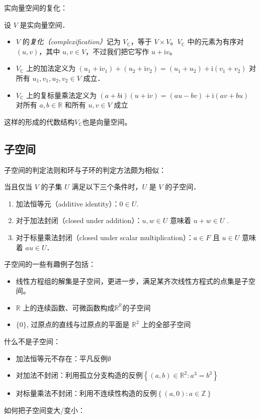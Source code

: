 实向量空间的复化：
\begin{definition}
    设 \(V\) 是实向量空间．
    \begin{itemize}
        \item \(V\) 的\emph{复化（complexification）}记为
            \(V_{\mathbb{C}}\)，等于 \(V \times
            V\)。\(V_{\mathbb{C}}\)
            中的元素为有序对 \((u, v)\)，其中
            \(u, v \in V\)，不过我们把它写作 \(u + \mathrm{i}v\)。
        \item \(V_{\mathbb{C}}\) 上的加法定义为
            \((u_1 + \mathrm{i}v_1) + (u_2 +
                \mathrm{i}v_2) = (u_1 +
            u_2) + \mathrm{i} (v_1 + v_2)\)
            对所有 \(u_1, v_1, u_2, v_2 \in V\) 成立．
        \item \(V_{\mathbb{C}}\) 上的复标量乘法定义为
            \((a + b\mathrm{i}) (u + \mathrm{i}v) =
                (au - bv) +
            \mathrm{i} (av + bu)\)
            对所有 \(a, b \in \mathbb{R}\) 和所有 \(u, v \in V\) 成立
    \end{itemize}
\end{definition}
这样的形成的代数结构\(V_{\mathbb{C}}\)也是向量空间。

\subsection{子空间}
子空间的判定法则和环与子环的判定方法颇为相似：
\begin{theorem}[子空间的条件]
    当且仅当 \(V\) 的子集 \(U\) 满足以下三个条件时，\(U\) 是 \(V\) 的子空间．
    \begin{enumerate}
        \item 加法恒等元（additive identity）：\(0 \in U\).
        \item 对于加法封闭（closed under addition）：\(u, w \in U\)
            意味着 \(u + w \in U\) .
        \item 对于标量乘法封闭（closed under scalar
            multiplication）：\(a \in F\)  且 \(u \in U\) 意味着
            \(au \in U\)．
    \end{enumerate}
\end{theorem}
子空间的一些有趣例子包括：
\begin{itemize}
    \item 线性方程组的解集是子空间，更进一步，满足某齐次线性方程式的点集是子空间。
    \item \(\mathbb{R}\) 上的连续函数、可微函数构成\(\mathbb{R}^{\mathbb{R}}\)的子空间
    \item \(\{0\}\), 过原点的直线与过原点的平面是 \(\mathbb{R}^{2}\) 上的全部子空间
\end{itemize}
什么不是子空间：
\begin{itemize}
    \item 加法恒等元不存在：平凡反例\(\emptyset\)
    \item 对加法不封闭：利用孤立分支构造的反例\(\left\{ (a,b)\in
        \mathbb{R}^{2}: a^{3}=b^{3}\right\}\)
    \item 对标量乘法不封闭：利用不连续性构造的反例\(\left\{(a,0):a\in \mathbb{Z}\right\}\)
\end{itemize}

如何把子空间变大/变小：
